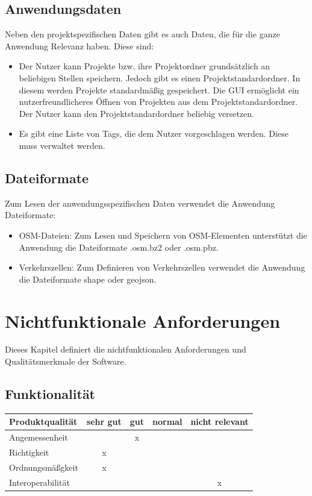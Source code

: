 \documentclass[parskip=full]{scrartcl} %
\begin{document}
\subsection*{Anwendungsdaten}
Neben den projektspezifischen Daten gibt es auch Daten, die für die ganze Anwendung Relevanz haben. Diese sind:
\begin{itemize}
    \item Der Nutzer kann Projekte bzw. ihre Projektordner grundsätzlich an beliebigen Stellen speichern. Jedoch gibt es einen Projektstandardordner. In diesem werden Projekte standardmäßig gespeichert. Die GUI ermöglicht ein nutzerfreundlicheres Öffnen von Projekten aus dem Projektstandardordner. Der Nutzer kann den Projektstandardordner beliebig versetzen.
    \item Es gibt eine Liste von Tags, die dem Nutzer vorgeschlagen werden. Diese muss verwaltet werden.
\end{itemize}


\subsection*{Dateiformate} \hypertarget{dataformat}{}
Zum Lesen der anwendungsspezifischen Daten verwendet die Anwendung Dateiformate:
\begin{itemize}
    \item OSM-Dateien: Zum Lesen und Speichern von OSM-Elementen unterstützt die Anwendung die Dateiformate .osm.bz2 oder .osm.pbz.
    \item Verkehrszellen: Zum Definieren von Verkehrszellen verwendet die Anwendung die Dateiformate shape oder geojson.
\end{itemize}


\newpage



\section{Nichtfunktionale Anforderungen}

Dieses Kapitel definiert die nichtfunktionalen Anforderungen und Qualitätsmerkmale der Software.

\subsection{Funktionalität}

\begin{tabular}{|l| c| c| c| c|}
    \hline
        Produktqualität & sehr gut & gut & normal & nicht relevant \\
    \hline
        Angemessenheit & & x & &\\
    \hline
        Richtigkeit & x & & &\\
    \hline
        Ordnungsmäßgkeit & x & & &\\
    \hline
        Interoperabilität & & & & x\\
    \hline
        
    \end{tabular}
\end{document}
